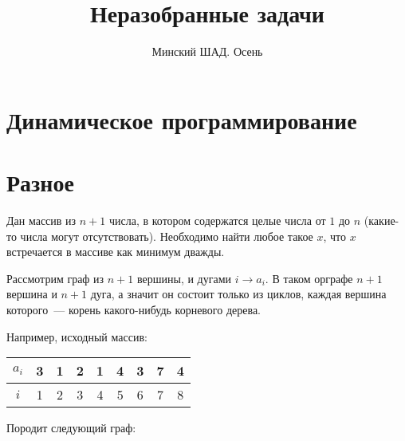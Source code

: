 \documentclass[addpoints]{exam}
\title{Неразобранные задачи}
\author{Минский ШАД. Осень}
\begin{document}
\maketitle

\begin{questions}

\section{Динамическое программирование}


\section{Разное}

\question[3] Дан массив из $n+1$ числа, в котором содержатся целые числа от $1$ до $n$ (какие-то числа могут отсутствовать). Необходимо найти любое такое $x$, что $x$ встречается в массиве как минимум дважды.

\begin{solution}

Рассмотрим граф из $n+1$ вершины, и дугами $i \rightarrow a_i$. В таком орграфе $n+1$ вершина и $n+1$ дуга, а значит он состоит только из циклов, каждая вершина которого~--- корень какого-нибудь корневого дерева.

Например, исходный массив:

\begin{center}

\begin{tabular}{|c|c|c|c|c|c|c|c|c|}
\hline 
$a_i$ & 3 & 1 & 2 & 1 & 4 & 3 & 7 & 4 \\ 
\hline 
$i$ & 1 & 2 & 3 & 4 & 5 & 6 & 7 & 8 \\ 
\hline 
\end{tabular} 

\end{center}

Породит следующий граф:

\begin{center}

\end{center}
\end{solution}
\end{questions}
\end{document}
